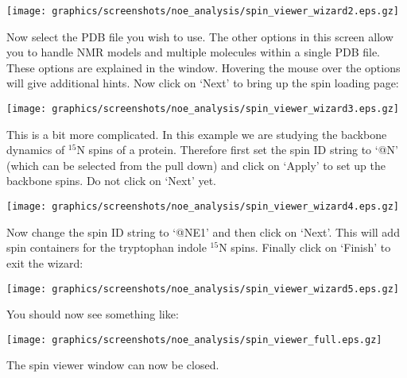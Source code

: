 \begin{minipage}[h]{\linewidth}
\centerline{\texttt{[image: graphics/screenshots/noe\_analysis/spin\_viewer\_wizard2.eps.gz]}}
\end{minipage}

Now select the PDB file you wish to use.  The other options in this screen allow you to handle NMR models and multiple molecules within a single PDB file.  These options are explained in the window.  Hovering the mouse over the options will give additional hints.  Now click on `Next' to bring up the spin loading page:

\begin{minipage}[h]{\linewidth}
\centerline{\texttt{[image: graphics/screenshots/noe\_analysis/spin\_viewer\_wizard3.eps.gz]}}
\end{minipage}

This is a bit more complicated.  In this example we are studying the backbone dynamics of $^{15}$N spins of a protein.  Therefore first set the spin ID string to `@N' (which can be selected from the pull down) and click on `Apply' to set up the backbone spins.  Do not click on `Next' yet.


\begin{minipage}[h]{\linewidth}
\centerline{\texttt{[image: graphics/screenshots/noe\_analysis/spin\_viewer\_wizard4.eps.gz]}}
\end{minipage}

Now change the spin ID string to `@NE1' and then click on `Next'.  This will add spin containers for the tryptophan indole $^{15}$N spins.  Finally click on `Finish' to exit the wizard:

\begin{minipage}[h]{\linewidth}
\centerline{\texttt{[image: graphics/screenshots/noe\_analysis/spin\_viewer\_wizard5.eps.gz]}}
\end{minipage}

You should now see something like:

\begin{minipage}[h]{\linewidth}
\centerline{\texttt{[image: graphics/screenshots/noe\_analysis/spin\_viewer\_full.eps.gz]}}
\end{minipage}

The spin viewer window can now be closed.



